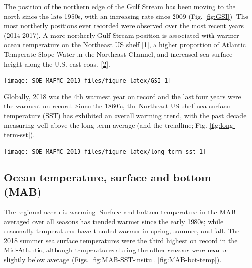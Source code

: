 \documentclass[10pt,]{article}
\let\origfigure\figure
\let\endorigfigure\endfigure
\renewenvironment{figure}[1][2] {
    \expandafter\origfigure\expandafter[H]
} {
    \endorigfigure
}
\begin{document}
The position of the northern edge of the Gulf Stream has been moving to
the north since the late 1950s, with an increasing rate since 2009 (Fig.
\ref{fig:GSI}). The most northerly positions ever recorded were observed
over the most recent years (2014-2017). A more northerly Gulf Stream
position is associated with warmer ocean temperature on the Northeast US
shelf {[}\protect\hyperlink{ref-zhang_role_2007}{1}{]}, a higher
proportion of Atlantic Temperate Slope Water in the Northeast Channel,
and increased sea surface height along the U.S. east coast
{[}\protect\hyperlink{ref-goddard_extreme_2015}{2}{]}.

\begin{figure}

{\centering \texttt{[image: SOE-MAFMC-2019\_files/figure-latex/GSI-1]} 

}

\caption{Index representing changes in the location of the Gulf Stream north wall. Positive values represent a more northerly Gulf Stream position.}\label{fig:GSI}
\end{figure}

Globally, 2018 was the 4th warmest year on record and the last four
years were the warmest on record. Since the 1860's, the Northeast US
shelf sea surface temperature (SST) has exhibited an overall warming
trend, with the past decade measuring well above the long term average
(and the trendline; Fig. \ref{fig:long-term-sst}).

\begin{figure}

{\centering \texttt{[image: SOE-MAFMC-2019\_files/figure-latex/long-term-sst-1]} 

}

\caption{Average annual sea surface temperature (SST) over the Northeast US Shelf}\label{fig:long-term-sst}
\end{figure}

\subsection{Ocean temperature, surface and bottom
(MAB)}\label{ocean-temperature-surface-and-bottom-mab}

The regional ocean is warming. Surface and bottom temperature in the MAB
averaged over all seasons has trended warmer since the early 1980s;
while seasonally temperatures have trended warmer in spring, summer, and
fall. The 2018 summer sea surface temperatures were the third highest on
record in the Mid-Atlantic, although temperatures during the other
seasons were near or slightly below average (Figs.
\ref{fig:MAB-SST-insitu}, \ref{fig:MAB-bot-temp}).
\end{document}
